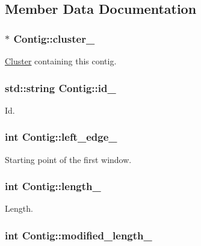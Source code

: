 \subsection{Member Data Documentation}
\hypertarget{classContig_a6471f93dd7c670423724e1ad8daf119a}{
\subsubsection[{cluster\_\-}]{$\ast$ {\bf Contig::cluster\_\-}}}
\label{classContig_a6471f93dd7c670423724e1ad8daf119a}
\hyperlink{classCluster}{Cluster} containing this contig. \hypertarget{classContig_af2fd571bd7cb1dd9c7c4d0558b19e429}{
\subsubsection[{id\_\-}]{\setlength{\rightskip}{0pt plus 5cm}std::string {\bf Contig::id\_\-}}}
\label{classContig_af2fd571bd7cb1dd9c7c4d0558b19e429}
Id. \hypertarget{classContig_a7b69a4c23403447450fa33c5d4734445}{
\subsubsection[{left\_\-edge\_\-}]{\setlength{\rightskip}{0pt plus 5cm}int {\bf Contig::left\_\-edge\_\-}}}
\label{classContig_a7b69a4c23403447450fa33c5d4734445}
Starting point of the first window. \hypertarget{classContig_a7b13f9fa4a6e4637bcffa3d53f0f2bce}{
\subsubsection[{length\_\-}]{\setlength{\rightskip}{0pt plus 5cm}int {\bf Contig::length\_\-}}}
\label{classContig_a7b13f9fa4a6e4637bcffa3d53f0f2bce}
Length. \hypertarget{classContig_aa6684a56e15ee58bd476f540d374a533}{
\subsubsection[{modified\_\-length\_\-}]{\setlength{\rightskip}{0pt plus 5cm}int {\bf Contig::modified\_\-length\_\-}}}
